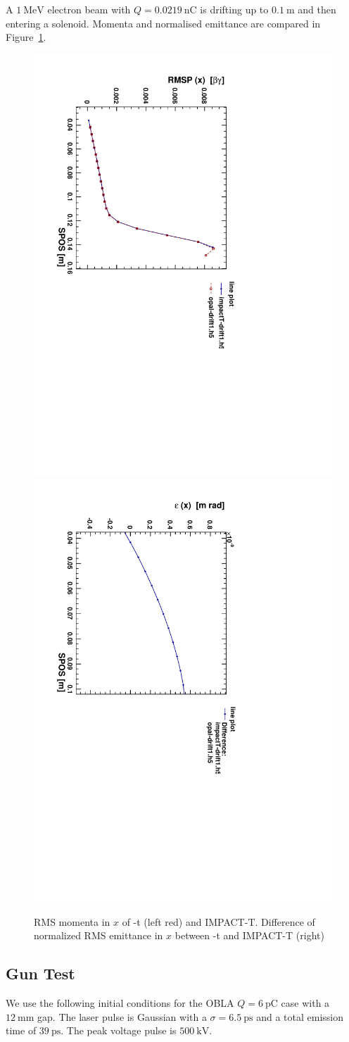 \documentclass{psi-note}    %
\begin{document}
A $1~\mbox{MeV}$ electron beam with $Q=0.0219 ~ \mbox{nC}$ is drifting up to
$0.1~\mbox{m}$ and then entering a solenoid. Momenta and normalised emittance
are compared in Figure~\ref{fig:dr-opal-1}. 
\begin{figure}[htbp]
\begin{center}
\includegraphics[width=.35\linewidth,angle=90]{figures/impactT-drift1-opal-drift1-RMSP-x-SPOS}
\includegraphics[width=.35\linewidth,angle=90]{figures/impactT-drift1-opal-drift1-varepsilon-x-SPOS}
\caption{RMS momenta in $x$ of \opal-t (left red) and IMPACT-T. Difference of normalized RMS emittance in $x$ between \opal-t  and IMPACT-T (right)}
\label{fig:dr-opal-1}
\end{center}
\end{figure}
\clearpage
\subsection{Gun Test}      \label{sec:Gun}   
We use the following initial conditions for the OBLA $Q=6 ~ \mbox{pC}$ case with
a $12~\mbox{mm}$ gap. The laser pulse is Gaussian with a $\sigma=6.5~\mbox{ps}$
and a total emission time of $39~\mbox{ps}$. The peak voltage pulse is
$500~\mbox{kV}$.
\end{document}
